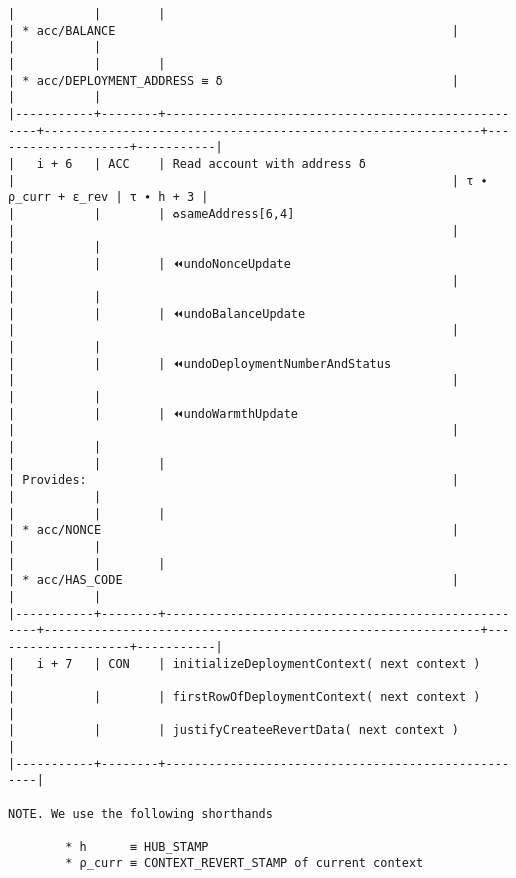 \documentclass[varwidth=\maxdimen,margin=0.5cm,multi={verbatim}]{standalone}
\begin{document}
\begin{verbatim}
|           |        |                                                    | * acc/BALANCE                                               |                    |           |
|           |        |                                                    | * acc/DEPLOYMENT_ADDRESS ≡ δ                                |                    |           |
|-----------+--------+----------------------------------------------------+-------------------------------------------------------------+--------------------+-----------|
|   i + 6   | ACC    | Read account with address δ                        |                                                             | τ ∙ ρ_curr + ε_rev | τ ∙ h + 3 |
|           |        | ♻️sameAddress[6,4]                                 |                                                             |                    |           |
|           |        | ⏪undoNonceUpdate                                  |                                                             |                    |           |
|           |        | ⏪undoBalanceUpdate                                |                                                             |                    |           |
|           |        | ⏪undoDeploymentNumberAndStatus                    |                                                             |                    |           |
|           |        | ⏪undoWarmthUpdate                                 |                                                             |                    |           |
|           |        |                                                    | Provides:                                                   |                    |           |
|           |        |                                                    | * acc/NONCE                                                 |                    |           |
|           |        |                                                    | * acc/HAS_CODE                                              |                    |           |
|-----------+--------+----------------------------------------------------+-------------------------------------------------------------+--------------------+-----------|
|   i + 7   | CON    | initializeDeploymentContext( next context )        |
|           |        | firstRowOfDeploymentContext( next context )        |
|           |        | justifyCreateeRevertData( next context )           |
|-----------+--------+----------------------------------------------------|

NOTE. We use the following shorthands

        * h      ≡ HUB_STAMP
        * ρ_curr ≡ CONTEXT_REVERT_STAMP of current context

\end{verbatim}
\end{document}
